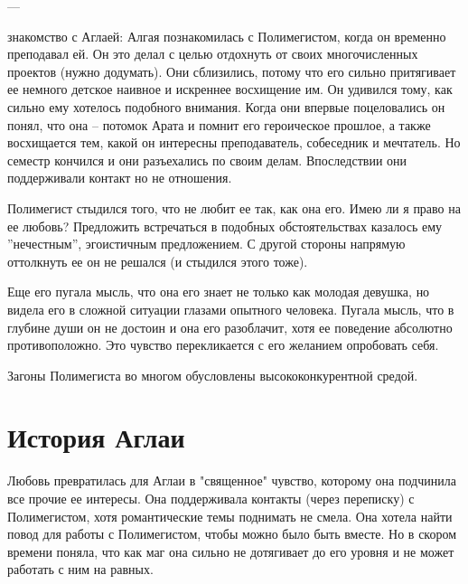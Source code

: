 \documentclass[12pt,a4paper]{article}
\begin{document}
---

знакомство с Аглаей:
Алгая познакомилась с Полимегистом, когда он временно преподавал ей.
Он это делал с целью отдохнуть от своих многочисленных проектов (нужно додумать). Они сблизились, потому что его сильно притягивает ее немного детское наивное и искреннее восхищение им. Он удивился тому, как сильно ему хотелось подобного внимания. Когда они впервые поцеловались он понял, что она -- потомок Арата и помнит его героическое прошлое, а также восхищается тем, какой он интересны преподаватель, собеседник и мечтатель.
Но семестр кончился и они разъехались по своим делам.
Впоследствии они поддерживали контакт но не отношения.

Полимегист стыдился того, что не любит ее так, как она его. Имею ли я право на ее любовь? Предложить встречаться в подобных обстоятельствах казалось ему ''нечестным'', эгоистичным предложением. С другой стороны напрямую оттолкнуть ее он не решался (и стыдился этого тоже).

Еще его пугала мысль, что она его знает не только как молодая девушка, но видела его в сложной ситуации глазами опытного человека. Пугала мысль, что в глубине души он не достоин и она его разоблачит, хотя ее поведение абсолютно противоположно. Это чувство перекликается с его желанием опробовать себя.

Загоны Полимегиста во многом обусловлены высококонкурентной средой.


\section*{История Аглаи}
Любовь превратилась для Аглаи в "священное" чувство, которому она подчинила все прочие ее интересы. Она поддерживала контакты (через переписку) с Полимегистом, хотя романтические темы поднимать не смела.
Она хотела найти повод для работы с Полимегистом, чтобы можно было быть вместе. Но в скором времени поняла, что как маг она сильно не дотягивает до его уровня и не может работать с ним на равных.
\end{document}
